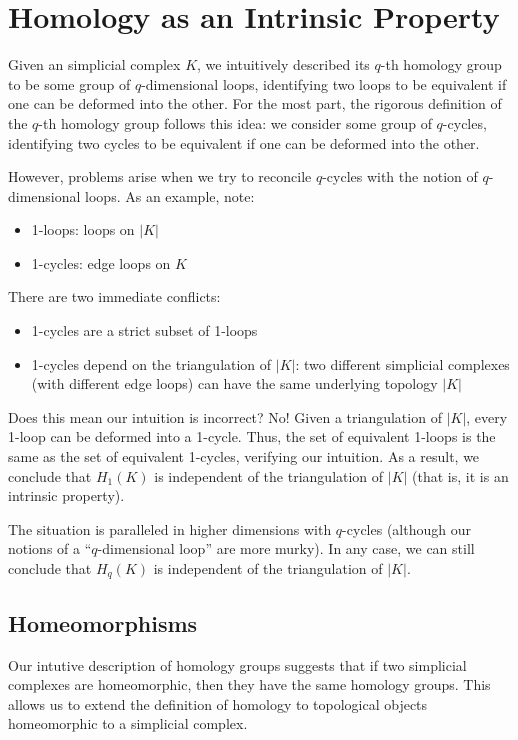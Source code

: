 \section{Homology as an Intrinsic Property}
Given an simplicial complex $K$, we intuitively described its $q$-th homology group to be some group of $q$-dimensional loops, identifying two loops to be equivalent if one can be deformed into the other. For the most part, the rigorous definition of the $q$-th homology group follows this idea: we consider some group of $q$-cycles, identifying two cycles to be equivalent if one can be deformed into the other.

However, problems arise when we try to reconcile $q$-cycles with the notion of $q$-dimensional loops. As an example, note:
\begin{itemize}
    \item 1-loops: loops on $|K|$
    \item 1-cycles: edge loops on $K$
\end{itemize}
There are two immediate conflicts:
\begin{itemize}
    \item 1-cycles are a strict subset of 1-loops
    \item 1-cycles depend on the triangulation of $|K|$: two different simplicial complexes (with different edge loops) can have the same underlying topology $|K|$
\end{itemize}

Does this mean our intuition is incorrect? No! Given a triangulation of $|K|$, every 1-loop can be deformed into a 1-cycle. Thus, the set of equivalent 1-loops is the same as the set of equivalent 1-cycles, verifying our intuition. As a result, we conclude that $H_1(K)$ is independent of the triangulation of $|K|$ (that is, it is an intrinsic property).

The situation is paralleled in higher dimensions with $q$-cycles (although our notions of a ``$q$-dimensional loop'' are more murky). In any case, we can still conclude that $H_q(K)$ is independent of the triangulation of $|K|$.

\subsection{Homeomorphisms}
Our intutive description of homology groups suggests that if two simplicial complexes are homeomorphic, then they have the same homology groups. This allows us to extend the definition of homology to topological objects homeomorphic to a simplicial complex.